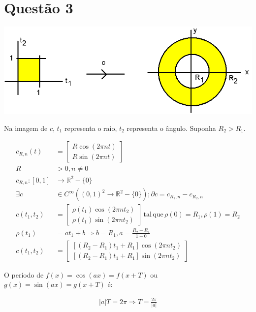 \documentclass[12pt,a4paper]{article}
\begin{document}
	\section{Quest\~ao 3}
		\begin{center}
		\includegraphics[scale=.5]{questao3}
		\end{center}

		Na imagem de $c$, $t_1$ representa o raio, $t_2$ representa o \^angulo. Suponha $R_2 > R_1$.

		\begin{align}
			c_{R,n}(t) &= \begin{bmatrix} R \cos(2\pi nt) \\ R \sin(2\pi nt) \end{bmatrix} \\
			R &> 0, n \neq 0 \\
			c_{R,n} : [0,1] &\rightarrow \mathbb{R}^2 - \{0\} \\
			\exists c &\in C^\infty( (0,1)^2 \rightarrow \mathbb{R}^2 - \{0\} ) ; \partial c = c_{R_1,n} - c_{R_2,n} \\
			c(t_1, t_2) &= \begin{bmatrix} \rho(t_1) \cos(2\pi nt_2) \\ \rho(t_1) \sin(2\pi nt_2) \end{bmatrix} \mathrm{\,tal\,que\,} \rho(0) = R_1 , \rho(1) = R_2 \\
			\rho(t_1) &= a t_1 + b \Rightarrow b = R_1, a = \frac{R_2 - R_1}{1 - 0} \\
			c(t_1, t_2) &= \begin{bmatrix} [(R_2 - R_1) t_1 + R_1] \cos(2\pi nt_2) \\ [(R_2 - R_1) t_1 + R_1]  \sin(2\pi nt_2) \end{bmatrix}
		\end{align}

		O per\'iodo de $f(x) = \cos(a x) = f(x + T)$ ou $g(x) = \sin (a x) = g(x + T)$ \'e:

		\begin{align}
			|a| T = 2 \pi \Rightarrow T = \frac{2 \pi}{|a|}
		\end{align}
\end{document}
